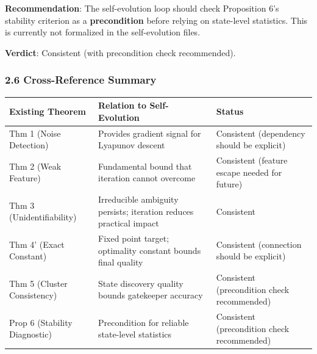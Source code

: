\documentclass[
  12pt,
]{ctexart}
\begin{document}
\textbf{Recommendation}: The self-evolution loop should check
Proposition 6's stability criterion as a \textbf{precondition} before
relying on state-level statistics. This is currently not formalized in
the self-evolution files.

\textbf{Verdict}: Consistent (with precondition check recommended).

\subsubsection{2.6 Cross-Reference
Summary}\label{cross-reference-summary}

\begin{longtable}[]{@{}
  >{\raggedright\arraybackslash}p{}
  >{\raggedright\arraybackslash}p{}
  >{\raggedright\arraybackslash}p{}@{}}
\toprule\noalign{}
\begin{minipage}[b]{\linewidth}\raggedright
Existing Theorem
\end{minipage} & \begin{minipage}[b]{\linewidth}\raggedright
Relation to Self-Evolution
\end{minipage} & \begin{minipage}[b]{\linewidth}\raggedright
Status
\end{minipage} \\
\midrule\noalign{}
\endhead
\bottomrule\noalign{}
\endlastfoot
Thm 1 (Noise Detection) & Provides gradient signal for Lyapunov descent
& Consistent (dependency should be explicit) \\
Thm 2 (Weak Feature) & Fundamental bound that iteration cannot overcome
& Consistent (feature escape needed for future) \\
Thm 3 (Unidentifiability) & Irreducible ambiguity persists; iteration
reduces practical impact & Consistent \\
Thm 4' (Exact Constant) & Fixed point target; optimality constant bounds
final quality & Consistent (connection should be explicit) \\
Thm 5 (Cluster Consistency) & State discovery quality bounds gatekeeper
accuracy & Consistent (precondition check recommended) \\
Prop 6 (Stability Diagnostic) & Precondition for reliable state-level
statistics & Consistent (precondition check recommended) \\
\end{longtable}
\end{document}
